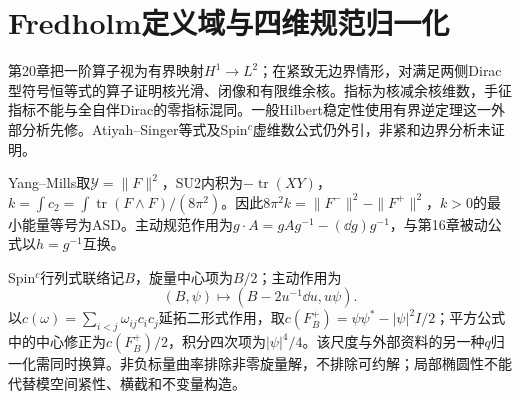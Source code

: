 \section{Fredholm定义域与四维规范归一化}
第20章把一阶算子视为有界映射$H^1\to L^2$；在紧致无边界情形，对满足两侧Dirac型符号恒等式的算子证明核光滑、闭像和有限维余核。指标为核减余核维数，手征指标不能与全自伴Dirac的零指标混同。一般Hilbert稳定性使用有界逆定理这一外部分析先修。Atiyah--Singer等式及Spin$^c$虚维数公式仍外引，非紧和边界分析未证明。

Yang--Mills取$\mathcal Y=\|F\|^2$，SU2内积为$-\operatorname{tr}(XY)$，$k=\int c_2=\int\operatorname{tr}(F\wedge F)/(8\pi^2)$。因此$8\pi^2k=\|F^-\|^2-\|F^+\|^2$，$k>0$的最小能量等号为ASD。主动规范作用为$g\cdot A=gAg^{-1}-(\dd g)g^{-1}$，与第16章被动公式以$h=g^{-1}$互换。

Spin$^c$行列式联络记$B$，旋量中心项为$B/2$；主动作用为
\[
 (B,\psi)\longmapsto(B-2u^{-1}\dd u,u\psi).
\]
以$c(\omega)=\sum_{i<j}\omega_{ij}c_ic_j$延拓二形式作用，取$c(F_B^+)=\psi\psi^*-|\psi|^2I/2$；平方公式中的中心修正为$c(F_B^+)/2$，积分四次项为$|\psi|^4/4$。该尺度与外部资料的另一种$q$归一化需同时换算。非负标量曲率排除非零旋量解，不排除可约解；局部椭圆性不能代替模空间紧性、横截和不变量构造。
